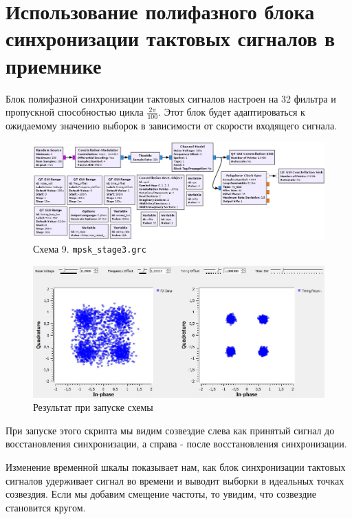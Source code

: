 \documentclass[a4paper, 12pt]{report}
\begin{document}
	\chapter{Использование полифазного блока синхронизации тактовых сигналов в приемнике}
	Блок полифазной синхронизации тактовых сигналов настроен на 32 фильтра и пропускной способностью цикла $\frac{2 \pi}{100}$. Этот блок будет адаптироваться к ожидаемому значению выборок в зависимости от скорости входящего сигнала.
	\begin{figure}[H]
		\centering
		\includegraphics[width=1.0\textwidth]{21.jpg}
		\caption{Схема 9. \texttt{mpsk\_stage3.grc}}
		\label{fig:21}
	\end{figure}
	\begin{figure}[H]
		\centering
		\includegraphics[width=1.0\textwidth]{22.jpg}
		\caption{Результат при запуске схемы}
		\label{fig:22}
	\end{figure}
	При запуске этого скрипта мы видим созвездие слева как принятый сигнал до восстановления синхронизации, а справа - после восстановления синхронизации.
	
	Изменение временной шкалы показывает нам, как блок синхронизации тактовых сигналов удерживает сигнал во времени и выводит выборки в идеальных точках созвездия. Если мы добавим смещение частоты, то увидим, что созвездие становится кругом.
	
\end{document}
